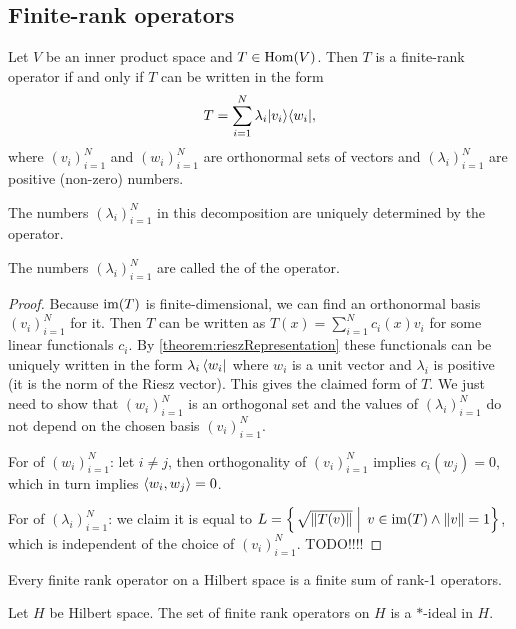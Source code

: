 \subsection{Finite-rank operators}
\begin{proposition} \label{lemma:finiteRankSingularValues}
Let $V$ be an inner product space and $T\in\operatorname{Hom}(V)$. Then $T$ is a finite-rank operator \textup{if and only if} $T$ can be written in the form
\[ T = \sum_{i=1}^N \lambda_i |v_i\rangle\langle w_i|, \]
where $(v_i)_{i=1}^N$ and $(w_i)_{i=1}^N$ are orthonormal sets of vectors and $(\lambda_i)_{i=1}^N$ are positive (non-zero) numbers.

The numbers $(\lambda_i)_{i=1}^N$ in this decomposition are uniquely determined by the operator.
\end{proposition}
The numbers $(\lambda_i)_{i=1}^N$ are called the  of the operator.
\begin{proof}
Because $\operatorname{im}(T)$ is finite-dimensional, we can find an orthonormal basis $(v_i)_{i=1}^N$ for it. Then $T$ can be written as $T(x) = \sum_{i=1}^N c_i(x)v_i$ for some linear functionals $c_i$. By \ref{theorem:rieszRepresentation} these functionals can be uniquely written in the form $\lambda_i\left\langle w_i \right|$ where $w_i$ is a unit vector and $\lambda_i$ is positive (it is the norm of the Riesz vector). This gives the claimed form of $T$. We just need to show that $(w_i)_{i=1}^N$ is an orthogonal set and the values of $(\lambda_i)_{i=1}^N$ do not depend on the chosen basis $(v_i)_{i=1}^N$.

For  of $(w_i)_{i=1}^N$: let $i\neq j$, then orthogonality of $(v_i)_{i=1}^N$ implies $c_i(w_j) = 0$, which in turn implies $\left\langle w_i,w_j \right\rangle = 0$.

For  of $(\lambda_i)_{i=1}^N$: we claim it is equal to $L = \left\{\left. \sqrt{\lVert T(v)\rVert} \;\right|\; v\in\operatorname{im}(T)\land\lVert v\rVert=1 \right\}$, which is independent of the choice of $(v_i)_{i=1}^N$. TODO!!!!
\end{proof}
\begin{corollary}
Every finite rank operator on a Hilbert space is a finite sum of rank-1 operators.
\end{corollary}

\begin{lemma}
Let $H$ be Hilbert space. The set of finite rank operators on $H$ is a $*$-ideal in $H$.
\end{lemma}

